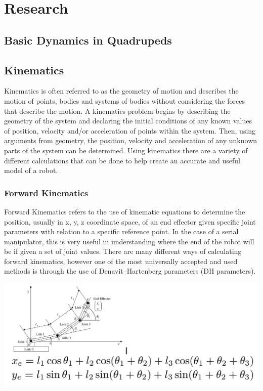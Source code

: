 \graphicspath{ {./figures/} }
\section{Research}
\subsection{Basic Dynamics in Quadrupeds}
\subsection{Kinematics}
 Kinematics is  often referred to as the geometry of motion and describes the motion of points, bodies and systems of bodies without considering the forces that describe the motion. A kinematics problem begins by describing the geometry of the system and declaring the initial conditions of any known values of position, velocity and/or acceleration of points within the system. Then, using arguments from geometry, the position, velocity and acceleration of any unknown parts of the system can be determined. Using kinematics there are a variety of different calculations that can be done to help create an accurate and useful model of a robot. 
    \subsubsection{Forward Kinematics}
    Forward Kinematics refers to the use of kinematic equations to determine the position, usually in x, y, z coordinate space, of an end effector given specific joint parameters with relation to a specific reference point. In the case of a serial manipulator, this is very useful in understanding where the end of the robot will be if given a set of joint values. There are many different ways of calculating forward kinematics, however one of the most universally accepted and used methods is through the use of Denavit–Hartenberg parameters (DH parameters).
    \begin{center}
    \includegraphics[width=150mm]{3dof.PNG}
    \end{center}
